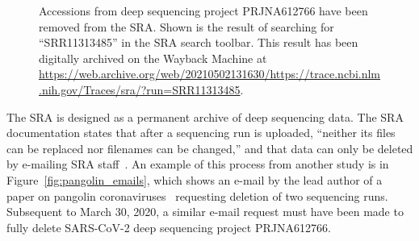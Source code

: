 \documentclass[9pt,twocolumn,twoside]{gsajnl_modified}
\begin{document}
\begin{figure}[]
\centering
{}
\caption{Accessions from deep sequencing project PRJNA612766 have been removed from the SRA.
Shown is the result of searching for ``SRR11313485'' in the SRA search toolbar.
This result has been digitally archived on the Wayback Machine at \url{https://web.archive.org/web/20210502131630/https://trace.ncbi.nlm.nih.gov/Traces/sra/?run=SRR11313485}.
}%
\label{fig:acc_removed}
\end{figure}

The SRA is designed as a permanent archive of deep sequencing data.
The SRA documentation states that after a sequencing run is uploaded, ``neither its files can be replaced nor filenames can be changed,'' and that data can only be deleted by e-mailing SRA staff~\citep{SRA_deletion}.
An example of this process from another study is in Figure~\ref{fig:pangolin_emails}, which shows an e-mail by the lead author of a paper on pangolin coronaviruses~\citep{xiao2020isolation} requesting deletion of two sequencing runs.
Subsequent to March 30, 2020, a similar e-mail request must have been made to fully delete SARS-CoV-2 deep sequencing project PRJNA612766.
\end{document}
